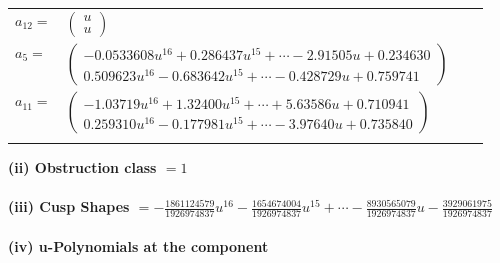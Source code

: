 \documentclass[1p]{elsarticle_modified}
\theoremstyle{definition}
\begin{document}
\begin{tabular}{m{7pt} m{180pt} m{7pt} m{180pt} }
\flushright $a_{12}=$&$\begin{pmatrix}u\\u\end{pmatrix}$ \\
\flushright $a_{5}=$&$\begin{pmatrix}-0.0533608 u^{16}+0.286437 u^{15}+\cdots-2.91505 u+0.234630\\0.509623 u^{16}-0.683642 u^{15}+\cdots-0.428729 u+0.759741\end{pmatrix}$ \\
\flushright $a_{11}=$&$\begin{pmatrix}-1.03719 u^{16}+1.32400 u^{15}+\cdots+5.63586 u+0.710941\\0.259310 u^{16}-0.177981 u^{15}+\cdots-3.97640 u+0.735840\end{pmatrix}$\\&\end{tabular}
\flushleft \textbf{(ii) Obstruction class $= 1$}\\~\\
\flushleft \textbf{(iii) Cusp Shapes $= -\frac{1861124579}{1926974837} u^{16}-\frac{1654674004}{1926974837} u^{15}+\cdots-\frac{8930565079}{1926974837} u-\frac{3929061975}{1926974837}$}\\~\\
\newpage\renewcommand{\arraystretch}{1}
\flushleft \textbf{(iv) u-Polynomials at the component}\newline \\
\end{document}
